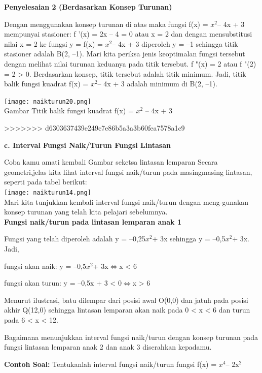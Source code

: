 \documentclass[11pt,fleqn]{book} %
\begin{document}
\textbf{Penyelesaian 2 (Berdasarkan Konsep
Turunan)}

Dengan menggunakan konsep turunan di atas maka
fungsi f(x) = $x^{2} $– 4x + 3 mempunyai stasioner: f '(x) = 2x – 4 = 0 atau x = 2 dan dengan mensubstitusi nilai x = 2 ke fungsi y = f(x) = $x^{2} $– 4x + 3 diperoleh y = –1 sehingga titik stasioner adalah B(2, –1). Mari kita periksa jenis keoptimalan fungsi tersebut dengan melihat nilai turunan keduanya pada titik tersebut. f "(x) = 2 atau f "(2) = 2 > 0.
Berdasarkan konsep, titik tersebut adalah titik minimum. Jadi, titik balik fungsi kuadrat f(x) = $x^{2} $– 4x + 3 adalah minimum di B(2, –1).

\begin{center}
\texttt{[image: naikturun20.png]}\\
Gambar Titik balik fungsi kuadrat f(x) = $x^{2}$ – 4x + 3
\end{center}
>>>>>>> d6303637439e249c7e86b5a3a3b60fea7578a1c9

\textbf{c. Interval Fungsi Naik/Turun Fungsi Lintasan}

Coba kamu amati kembali Gambar seketsa lintasan lemparan Secara geometri,jelas kita lihat interval fungsi naik/turun pada masingmasing lintasan, seperti pada tabel berikut:\\

\texttt{[image: naikturun14.png]}\\

Mari kita tunjukkan kembali interval fungsi naik/turun dengan meng-gunakan konsep turunan yang telah kita pelajari sebelumnya.\\

\textbf{Fungsi naik/turun pada lintasan lemparan anak 1}

Fungsi yang telah diperoleh adalah y = –0,25$x^{2} $+ 3x sehingga y = –0,5$x^{2} $+ 3x. Jadi,

fungsi akan naik: y = –0,5$x^{2} $+ 3x$ \Leftrightarrow $x < 6

fungsi akan turun: y = –0,5x + 3 < 0$ \Leftrightarrow $x > 6

Menurut ilustrasi, batu dilempar dari posisi awal O(0,0) dan jatuh pada posisi akhir Q(12,0) sehingga lintasan lemparan akan naik pada 0 < x < 6 dan turun pada 6 < x < 12.

Bagaimana menunjukkan interval fungsi naik/turun
dengan konsep turunan pada fungsi lintasan lemparan
anak 2 dan anak 3 diserahkan kepadamu.

\textbf {Contoh Soal:} 
Tentukanlah interval fungsi naik/turun fungsi f(x) = $x^{4} $– 2x$^{2}$
\end{document}
